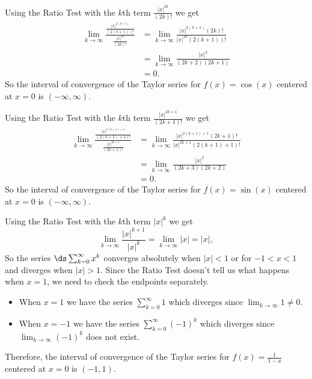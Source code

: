 \begin{activitySolution}
\ba
	\item Using the Ratio Test with the $k$th term $\frac{|x|^{2k}}{(2k)!}$ we get
\begin{align*}
\lim_{k \to \infty} \frac{ \frac{|x|^{2(k+1)}}{(2(k+1))!} }{ \frac{|x|^{2k}}{(2k)!} } &= \lim_{k \to \infty} \frac{|x|^{2(k+1)}(2k)!}{|x|^{2k}(2(k+1))!} \\
    &= \lim_{k \to \infty} \frac{|x|^{2}}{(2k+2)(2k+1)} \\
    &= 0.
\end{align*}
So the interval of convergence of the Taylor series for $f(x) = \cos(x)$ centered at $x=0$ is $(-\infty, \infty)$.

    \item Using the Ratio Test with the $k$th term $\frac{|x|^{2k+1}}{(2k+1)!}$ we get
\begin{align*}
\lim_{k \to \infty} \frac{ \frac{|x|^{2(k+1)+1}}{(2(k+1)+1)!} }{ \frac{|x|^{2k+1}}{(2k+1)!} } &= \lim_{k \to \infty} \frac{|x|^{2(k+1)+1}(2k+1)!}{|x|^{2k+1}(2(k+1)+1)!} \\
    &= \lim_{k \to \infty} \frac{|x|^{2}}{(2k+3)(2k+2)} \\
    &= 0.
\end{align*}
So the interval of convergence of the Taylor series for $f(x) = \sin(x)$ centered at $x=0$ is $(-\infty, \infty)$.

    \item Using the Ratio Test with the $k$th term $|x|^{k}$ we get
\[\lim_{k \to \infty} \frac{ |x|^{k+1} }{ |x|^{k} } = \lim_{k \to \infty} |x| = |x|,\]
So the series $\ds \sum_{k=0}^{\infty} x^k$ converges absolutely when $|x| < 1$ or for $-1 < x < 1$ and diverges when $|x| > 1$. Since the Ratio Test doesn't tell us what happens when $x=1$, we need to check the endpoints separately.
\begin{itemize} 
\item When $x=1$ we have the series $\sum_{k=0}^{\infty} 1$ which diverges since $\lim_{k \to \infty} 1 \neq 0$. 
\item When $x=-1$ we have the series $\sum_{k=0}^{\infty} (-1)^k$ which diverges since $\lim_{k \to \infty} (-1)^k$ does not exist.  
\end{itemize}
Therefore, the interval of convergence of the Taylor series for $f(x) = \frac{1}{1-x}$ centered at $x=0$ is $(-1,1)$.
\ea
\end{activitySolution}
\aftera 